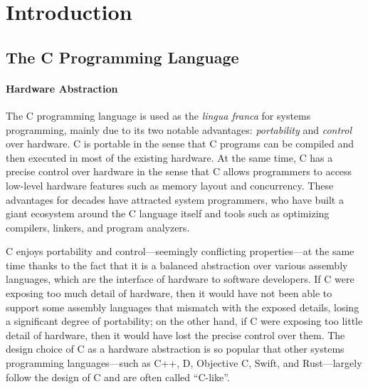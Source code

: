 \section{Introduction}
\label{sec:introduction}

\subsection{The C Programming Language}
\label{sec:introduction:context}

\paragraph{Hardware Abstraction}

The C programming language is used as the \emph{lingua franca} for systems programming, mainly due
to its two notable advantages: \emph{portability} and \emph{control} over hardware.  C is portable
in the sense that C programs can be compiled and then executed in most of the existing hardware.  At
the same time, C has a precise control over hardware in the sense that C allows programmers to
access low-level hardware features such as memory layout and concurrency.  These advantages for
decades have attracted system programmers, who have built a giant ecosystem around the C language
itself and tools such as optimizing compilers, linkers, and program analyzers.

C enjoys portability and control---seemingly conflicting properties---at the same time thanks to the
fact that it is a balanced abstraction over various assembly languages, which are the interface of
hardware to software developers.  If C were exposing too much detail of hardware, then it would have
not been able to support some assembly languages that mismatch with the exposed details, losing a
significant degree of portability; on the other hand, if C were exposing too little detail of
hardware, then it would have lost the precise control over them.  The design choice of C as a
hardware abstraction is so popular that other systems programming languages---such as C++, D,
Objective C, Swift, and Rust---largely follow the design of C and are often called ``C-like''.




